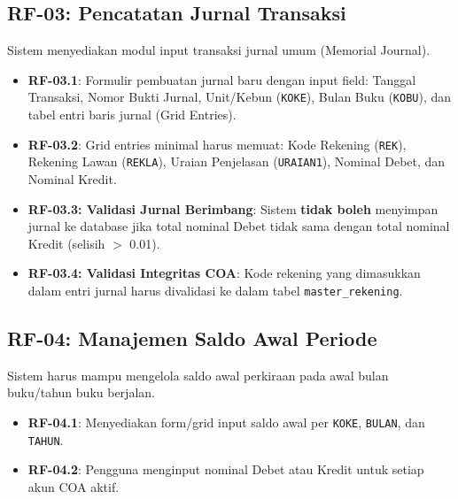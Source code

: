 \documentclass[11pt,a4paper]{article}
\begin{document}
\subsection{RF-03: Pencatatan Jurnal Transaksi}
Sistem menyediakan modul input transaksi jurnal umum (Memorial Journal).
\begin{itemize}
    \item \textbf{RF-03.1}: Formulir pembuatan jurnal baru dengan input field: Tanggal Transaksi, Nomor Bukti Jurnal, Unit/Kebun (\texttt{KOKE}), Bulan Buku (\texttt{KOBU}), dan tabel entri baris jurnal (Grid Entries).
    \item \textbf{RF-03.2}: Grid entries minimal harus memuat: Kode Rekening (\texttt{REK}), Rekening Lawan (\texttt{REKLA}), Uraian Penjelasan (\texttt{URAIAN1}), Nominal Debet, dan Nominal Kredit.
    \item \textbf{RF-03.3: Validasi Jurnal Berimbang}: Sistem \textbf{tidak boleh} menyimpan jurnal ke database jika total nominal Debet tidak sama dengan total nominal Kredit (selisih $>$ 0.01).
    \item \textbf{RF-03.4: Validasi Integritas COA}: Kode rekening yang dimasukkan dalam entri jurnal harus divalidasi ke dalam tabel \texttt{master\_rekening}.
\end{itemize}

\subsection{RF-04: Manajemen Saldo Awal Periode}
Sistem harus mampu mengelola saldo awal perkiraan pada awal bulan buku/tahun buku berjalan.
\begin{itemize}
    \item \textbf{RF-04.1}: Menyediakan form/grid input saldo awal per \texttt{KOKE}, \texttt{BULAN}, dan \texttt{TAHUN}.
    \item \textbf{RF-04.2}: Pengguna menginput nominal Debet atau Kredit untuk setiap akun COA aktif.
\end{itemize}
\end{document}
